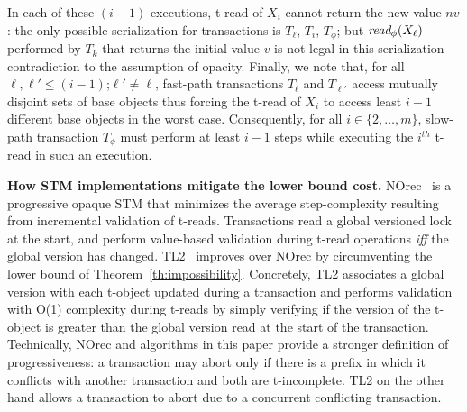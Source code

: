 \begin{proofsketch}
In each of these $(i-1)$ executions, t-read of $X_i$ cannot return the new value $nv$:
the only possible serialization for transactions is $T_{\ell}$, $T_i$, $T_{\phi}$; but $\textit{read}_{\phi}(X_{\ell})$
performed by $T_k$ that returns the initial value $v$ is not legal in this serialization---contradiction to the assumption of opacity.
Finally, we note that, for all $\ell, \ell' \leq (i-1)$;$\ell' \neq \ell$, 
fast-path transactions $T_{\ell}$ and $T_{\ell'}$ access mutually disjoint sets of base objects thus forcing the t-read of $X_i$ to access least $i-1$ different base objects
in the worst case.
Consequently, for all $i \in \{2,\ldots, m\}$, slow-path transaction $T_{\phi}$ must perform at least $i-1$ steps 
while executing the $i^{th}$ t-read in such an execution.
\end{proofsketch}
%
%
\vspace{1mm}\noindent\textbf{How STM implementations mitigate the lower bound cost.}
NOrec~\cite{norec} is a progressive opaque STM that minimizes the average step-complexity resulting from incremental 
validation of t-reads. Transactions read a global versioned lock at the start, and perform value-based validation
during t-read operations \emph{iff} the global version has changed.
TL2~\cite{DSS06} improves over NOrec by circumventing the lower bound
of Theorem~\ref{th:impossibility}. Concretely, TL2 associates a global version with each t-object updated during
a transaction and performs validation with O(1) complexity during t-reads by simply verifying if the version
of the t-object is greater than the global version read at the start of the transaction. Technically,
NOrec and algorithms in this paper provide a stronger definition of progressiveness: a transaction may abort
only if there is a prefix in which it conflicts with another transaction and both are t-incomplete. TL2 on the other hand allows
a transaction to abort due to a concurrent conflicting transaction.

